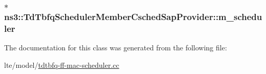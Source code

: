\subsubsection[{\texorpdfstring{m\+\_\+scheduler}{m_scheduler}}]{ $\ast$ ns3\+::\+Td\+Tbfq\+Scheduler\+Member\+Csched\+Sap\+Provider\+::m\+\_\+scheduler\hspace{0.3cm}{\ttfamily [private]}}\hypertarget{classns3_1_1TdTbfqSchedulerMemberCschedSapProvider_a259efac8dce5665e5e528d1624661a97}{}\label{classns3_1_1TdTbfqSchedulerMemberCschedSapProvider_a259efac8dce5665e5e528d1624661a97}


The documentation for this class was generated from the following file\+:\begin{DoxyCompactItemize}
\item 
lte/model/\hyperlink{lte_2model_2tdtbfq-ff-mac-scheduler_8cc}{tdtbfq-\/ff-\/mac-\/scheduler.\+cc}\end{DoxyCompactItemize}
